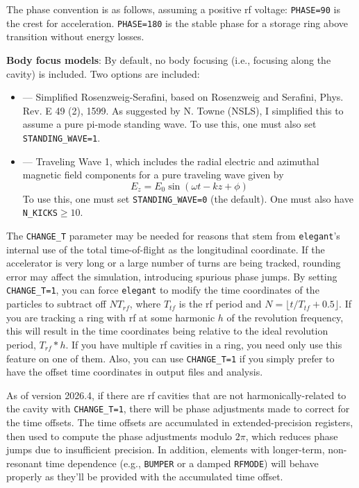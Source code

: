 The phase convention is as follows, assuming a positive rf voltage:
\verb|PHASE=90| is the crest for acceleration.  \verb|PHASE=180| is the stable
phase for a storage ring above transition without energy losses.

{\bf Body focus models}: By default, no body focusing (i.e., focusing along the
cavity) is included. Two options are included:
\begin{itemize}
\item[SRS] --- Simplified Rosenzweig-Serafini, based on Rosenzweig and Serafini, Phys. Rev. E 49 (2),
1599.  As suggested by N. Towne (NSLS), I simplified this to assume a pure pi-mode
standing wave. To use this, one must also set \verb|STANDING_WAVE=1|.
\item[TW1] --- Traveling Wave 1, which includes the radial electric and azimuthal
magnetic field components for a pure traveling wave given by 
\begin{equation}
        E_z = E_0 \sin \left(\omega t - k z + \phi\right)
\end{equation}
To use this, one must set \verb|STANDING_WAVE=0| (the default). One must also have \verb|N_KICKS|$\geq 10$.
\end{itemize}

The \verb|CHANGE_T| parameter may be needed for reasons that stem from
{\tt elegant}'s internal use of the total time-of-flight as the
longitudinal coordinate.  If the accelerator is very long or a large
number of turns are being tracked, rounding error may affect the
simulation, introducing spurious phase jumps.  By setting
\verb|CHANGE_T=1|, you can force {\tt elegant} to modify the time
coordinates of the particles to subtract off $N T_{rf}$, where
$T_{tf}$ is the rf period and $N = \lfloor t/T_{tf}+0.5\rfloor$.  If
you are tracking a ring with rf at some harmonic $h$ of the revolution
frequency, this will result in the time coordinates being relative to
the ideal revolution period, $T_{rf}*h$.  If you have multiple rf
cavities in a ring, you need only use this feature on one of them.
Also, you can use \verb|CHANGE_T=1| if you simply prefer to have the
offset time coordinates in output files and analysis. 

As of version 2026.4, if there are rf cavities that are not harmonically-related
to the cavity with \verb|CHANGE_T=1|, there will be phase adjustments made to
correct for the time offsets. The time offsets are accumulated in extended-precision
registers, then used to compute the phase adjustments modulo $2\pi$, which reduces
phase jumps due to insufficient precision.
In addition, elements with longer-term, non-resonant time dependence (e.g., \verb|BUMPER|
or a damped \verb|RFMODE|) will behave properly as they'll be provided with the accumulated
time offset.
